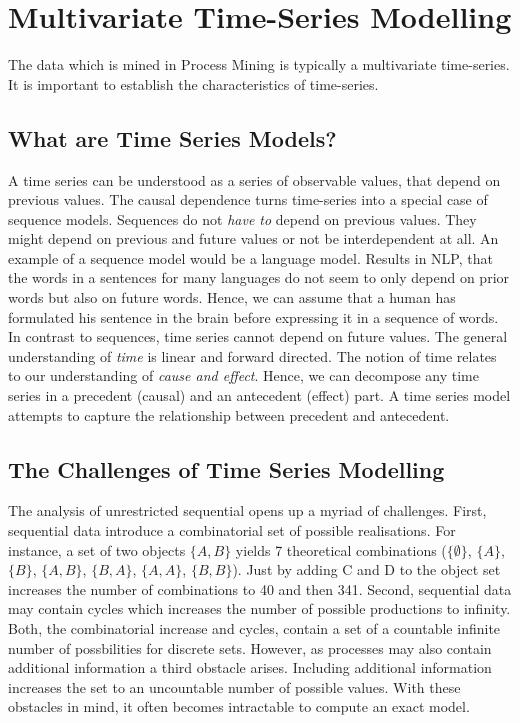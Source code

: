 \documentclass[12pt,a4paper]{report}
\begin{document}
\section{Multivariate Time-Series Modelling}
\label{sec:sequences}
The data which is mined in Process Mining is typically a multivariate time-series. It is important to establish the characteristics of time-series.

\subsection{What are Time Series Models?}
A time series can be understood as a series of observable values, that depend on previous values. The causal dependence turns time-series into a special case of sequence models. Sequences do not \emph{have to} depend on previous values. They might depend on previous and future values or not be interdependent at all. An example of a sequence model would be a language model. Results in \gls{NLP}, that the words in a sentences for many languages do not seem to only depend on prior words but also on future words\needscite. Hence, we can assume that a human has formulated his sentence in the brain before expressing it in a sequence of words\needscite. In contrast to sequences, time series cannot depend on future values. The general understanding of \emph{time} is linear and forward directed\needscite. The notion of time relates to our understanding of \emph{cause and effect}. Hence, we can decompose any time series in a precedent (causal) and an antecedent (effect) part. A time series model attempts to capture the relationship between precedent and antecedent. 

\subsection{The Challenges of Time Series Modelling}
The analysis of unrestricted sequential opens up a myriad of challenges. First, sequential data introduce a combinatorial set of possible realisations. For instance, a set of two objects $\{A,B\}$ yields 7 theoretical combinations ($\{\emptyset\}$, $\{A\}$, $\{B\}$, $\{A,B\}$, $\{B,A\}$, $\{A,A\}$, $\{B,B\}$). Just by adding C and D to the object set increases the number of combinations to 40 and then 341. %
Second, sequential data may contain cycles which increases the number of possible productions to infinity\needscite. Both, the combinatorial increase and cycles, contain a set of a countable infinite number of possbilities for discrete sets. However, as processes may also contain additional information a third obstacle arises. Including additional information increases the set to an uncountable number of possible values. With these obstacles in mind, it often becomes intractable to compute an exact model. 
\end{document}
